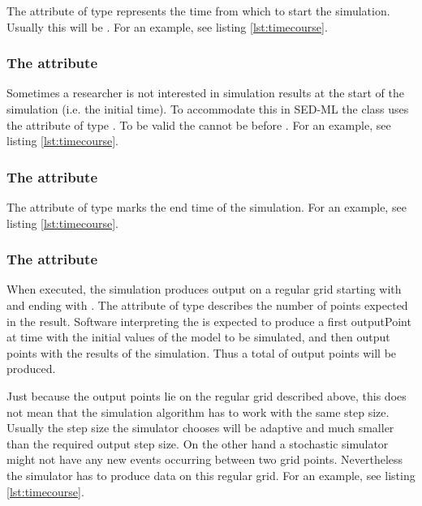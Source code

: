 The attribute  of type  represents the time from which to start the simulation. Usually this will be . For an example, see listing \ref{lst:timecourse}. 

\subsubsection{The  attribute}

\label{sec:outputStartTime}

Sometimes a researcher is not interested in simulation results at the start of the simulation (i.e. the initial time). To accommodate this in SED-ML the  class uses the  attribute  of type . To be valid the  cannot be before .  For an example, see listing \ref{lst:timecourse}. 

\subsubsection{The  attribute}
\label{sec:outputEndTime}

The attribute  of type  marks the end time of the simulation. For an example, see listing \ref{lst:timecourse}. 

\subsubsection{The  attribute}
\label{sec:numberOfPoints}

When executed, the  simulation produces output on a regular grid starting with  and ending with . The attribute   of type  describes the number of points expected in the result. Software interpreting the  is expected to produce a first outputPoint at time  with the initial values of the model to be simulated, and then  output points with the results of the simulation. Thus a total of  output points will be produced.

Just because the output points lie on the regular grid described above, this does not mean that the simulation algorithm has to work with the same step size. Usually the step size the simulator chooses will be adaptive and much smaller than the required output step size. On the other hand a stochastic simulator might not have any new events occurring between two grid points. Nevertheless the simulator has to produce data on this regular grid. For an example, see listing \ref{lst:timecourse}. 


